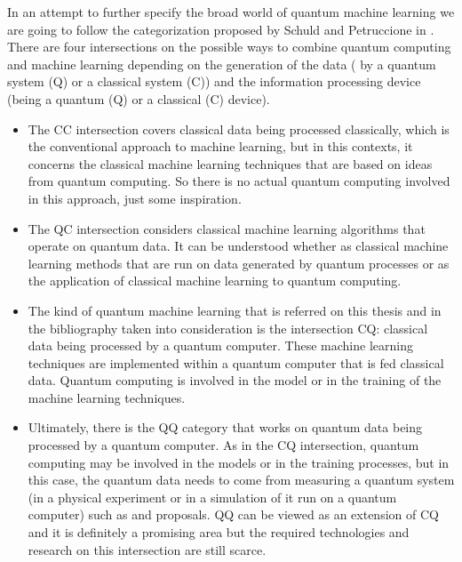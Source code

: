 In an attempt to further specify the broad world of quantum machine learning we are going to follow the categorization proposed by Schuld and Petruccione in \cite{schuld2021machine}. There are four intersections on the possible ways to combine quantum computing and machine learning depending on the generation of the data (  by a quantum system (Q) or a classical system (C)) and the information processing device (being a quantum (Q) or a classical (C) device).
\begin{itemize}
    \item The CC intersection covers classical data being processed classically, which is the conventional approach to machine learning, but in this contexts, it concerns the classical machine learning techniques that are based on ideas from quantum computing. So there is no actual quantum computing involved in this approach, just some inspiration.
    \item The QC intersection considers classical machine learning algorithms that operate on quantum data. It can be understood whether as classical machine learning methods that are run on data generated by quantum processes or as the application of classical machine learning to quantum computing. 
    \item The kind of quantum machine learning that is referred on this thesis and in the bibliography taken into consideration is the intersection CQ: classical data being processed by a quantum computer. These machine learning techniques are implemented within a quantum computer that is fed classical data. Quantum computing is involved in the model or in the training of the machine learning techniques.
    \item Ultimately, there is the QQ category that works on quantum data being processed by a quantum computer. As in the CQ intersection, quantum computing may be involved in the models or in the training processes, but in this case, the quantum data needs to come from measuring a quantum system (in a physical experiment or in a simulation of it run on a quantum computer) such as \cite{Perrier_QDataSet_Quantum_Datasets_2021} and \cite{schatzki2021entangled} proposals. QQ can be viewed as an extension of CQ and it is definitely a promising area but the required technologies and research on this intersection are still scarce.
\end{itemize}

